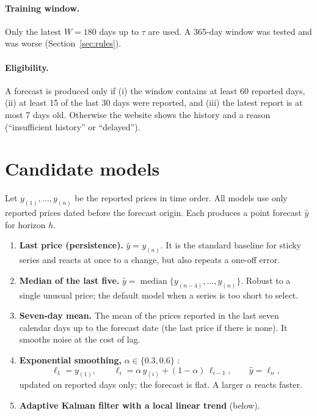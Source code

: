 \documentclass[12pt,a4paper,oneside]{report}
\numberwithin{equation}{chapter}
\numberwithin{figure}{chapter}
\numberwithin{table}{chapter}
\theoremstyle{definition}
\DeclareMathOperator{\med}{median}
\newcommand{\hatt}[1]{\widehat{#1}}
\begin{document}
\paragraph{Training window.} Only the latest $W=180$ days up to $\tau$ are used. A 365-day window was tested and was worse (Section~\ref{sec:rules}).

\paragraph{Eligibility.} A forecast is produced only if (i) the window contains at least 60 reported days, (ii) at least 15 of the last 30 days were reported, and (iii) the latest report is at most 7 days old. Otherwise the website shows the history and a reason (``insufficient history'' or ``delayed'').

\section{Candidate models}
Let $y_{(1)},\dots,y_{(n)}$ be the reported prices in time order. All models use only reported prices dated before the forecast origin. Each produces a point forecast $\hatt{y}$ for horizon $h$.

\begin{enumerate}
  \item \textbf{Last price (persistence).} $\hatt{y}=y_{(n)}$. It is the standard baseline for sticky series and reacts at once to a change, but also repeats a one-off error.
  \item \textbf{Median of the last five.} $\hatt{y}=\med\{y_{(n-4)},\dots,y_{(n)}\}$. Robust to a single unusual price; the default model when a series is too short to select.
  \item \textbf{Seven-day mean.} The mean of the prices reported in the last seven calendar days up to the forecast date (the last price if there is none). It smooths noise at the cost of lag.
  \item \textbf{Exponential smoothing,} $\alpha\in\{0.3,0.6\}$ \cite{gardner1985}:
  \begin{equation}
    \ell_1=y_{(1)},\qquad \ell_i=\alpha\,y_{(i)}+(1-\alpha)\,\ell_{i-1},\qquad \hatt{y}=\ell_n,
    \label{eq:es}
  \end{equation}
  updated on reported days only; the forecast is flat. A larger $\alpha$ reacts faster.
  \item \textbf{Adaptive Kalman filter with a local linear trend} (below).
\end{enumerate}
\end{document}
